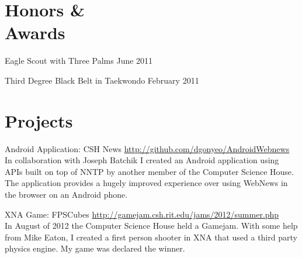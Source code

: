 \documentclass[letterpaper,margin,line,11pt]{resume}
\newcommand{\rurl}[1]{\hfill {\footnotesize \url{#1}}}
\begin{document}
\begin{resume}
\section{\mysidestyle Honors \& \\ Awards}
	\begin{asparablank}
		\item Eagle Scout with Three Palms \hfill June 2011
		\item Third Degree Black Belt in Taekwondo \hfill February 2011
	\end{asparablank}

\section{\mysidestyle Projects}
	\begin{compactdesc}
		\item[Android Application: CSH News] \rurl{http://github.com/dgonyeo/AndroidWebnews} \\
			In collaboration with Joseph Batchik I created an Android application using APIs built on top of NNTP by another member of the Computer Science House. The application provides a hugely improved experience over using WebNews in the browser on an Android phone.
                \item[XNA Game: FPSCubes] \rurl{http://gamejam.csh.rit.edu/jams/2012/summer.php} \\
			In August of 2012 the Computer Science House held a Gamejam. With some help from Mike Eaton, I created a first person shooter in XNA that used a third party physics engine. My game was declared the winner.
	\end{compactdesc}
\end{resume}
\end{document}

